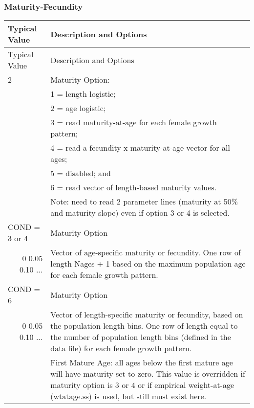 \subsubsection{Maturity-Fecundity}

\begin{longtable}{p{0.5cm} p{2cm} p{13cm}}
	\hline	
	\multicolumn{2}{l}{Typical Value} & Description and Options\Tstrut\Bstrut\\
	\hline
	\endfirsthead

	\hline
	\multicolumn{2}{l}{Typical Value} & Description and Options\Tstrut\Bstrut\\
	\hline
	\endhead
	\hline

	\endfoot
	
	\endlastfoot

	2 & & Maturity Option: \Tstrut\\
	  & & 1 = length logistic;\\
	  & & 2 = age logistic;\\
	  & & 3 = read maturity-at-age for each female growth pattern;\\
	  & & 4 = read a fecundity x maturity-at-age vector for all ages;\\
	  & & 5 = disabled; and \\
	  & & 6 = read vector of length-based maturity values.\\
	  & & Note: need to read 2 parameter lines (maturity at 50\% and maturity slope) even if option 3 or 4 is selected.\Bstrut \\
	\hline

	\multicolumn{2}{l}{COND = 3 or 4} & Maturity Option\Tstrut\\
	\multicolumn{2}{r}{0 0.05 0.10 ...} & Vector of age-specific maturity or fecundity.  One row of length Nages + 1 based on the maximum population age for each female growth pattern. \Bstrut\\
	\multicolumn{2}{l}{COND = 6} & Maturity Option\Tstrut\\
	\multicolumn{2}{r}{0 0.05 0.10 ...} & Vector of length-specific maturity or fecundity, based on the population length bins.  One row of length equal to the number of population length bins (defined in the data file) for each female growth pattern. \Bstrut\\
	\hline
	
	\Tstrut 1  & & First Mature Age: all ages below the first mature age will have maturity set to zero. This value is overridden if maturity option is 3 or 4 or if empirical weight-at-age (wtatage.ss) is used, but still must exist here.  \Bstrut\\
	\hline	  


\end{longtable}
